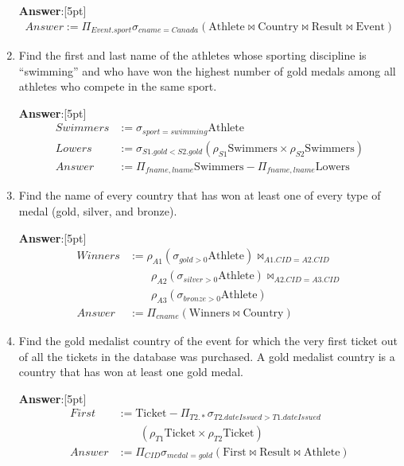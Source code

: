 \documentclass{article}
\begin{document}
\begin{enumerate}
{\bf Answer}:[5pt]
\begin{equation*}
\begin{aligned}
Answer := \Pi_{Event.sport} \sigma_{cname=Canada} (\mathrm{Athlete} \bowtie \mathrm{Country} \bowtie \mathrm{Result} \bowtie \mathrm{Event})
\end{aligned}
\end{equation*}

\item   %
Find the first and last name of the athletes whose sporting discipline is ``swimming''
and who have won the highest number of gold medals among all athletes who compete
in the same sport.

{\bf Answer}:[5pt]
\begin{equation*}
\begin{aligned}
Swimmers & := \sigma_{sport=swimming} \mathrm{Athlete} \\
Lowers & := \sigma_{S1.gold < S2.gold} (\rho_{S1} \mathrm{Swimmers} \times \rho_{S2} \mathrm{Swimmers}) \\
Answer & := \Pi_{fname, lname} \mathrm{Swimmers} - \Pi_{fname, lname} \mathrm{Lowers}
\end{aligned}
\end{equation*}

\item   %
Find the name of every country that has won at least one of every type of medal
(gold, silver, and bronze).

{\bf Answer}:[5pt]
\begin{equation*}
\begin{aligned}
Winners & := \rho_{A1} (\sigma_{gold>0} \mathrm{Athlete}) \bowtie_{A1.CID=A2.CID} \\
    & \quad \quad \rho_{A2} (\sigma_{silver>0} \mathrm{Athlete}) \bowtie_{A2.CID=A3.CID} \\
    & \quad \quad \rho_{A3} (\sigma_{bronze>0} \mathrm{Athlete}) \\
Answer & := \Pi_{cname} (\mathrm{Winners} \bowtie \mathrm{Country})
\end{aligned}
\end{equation*}


\item   %
Find the gold medalist country of the event for which the very first ticket out of
all the tickets in the database was purchased. A gold medalist country is a country
that has won at least one gold medal.

{\bf Answer}:[5pt]
\begin{equation*}
\begin{aligned}
First & := \mathrm{Ticket} - \Pi_{T2.*} \sigma_{T2.dateIssued > T1.dateIssued} \\
    & \quad \quad (\rho_{T1} \mathrm{Ticket} \times \rho_{T2} \mathrm{Ticket}) \\
Answer & := \Pi_{CID} \sigma_{medal=gold}(\mathrm{First} \bowtie \mathrm{Result} \bowtie \mathrm{Athlete})
\end{aligned}
\end{equation*}



\end{enumerate}
\end{document}
